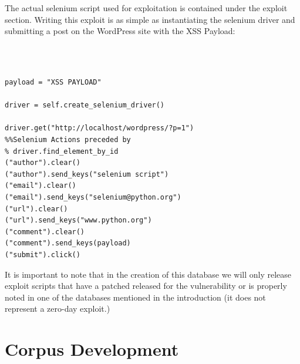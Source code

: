 \documentclass[letterpaper,twocolumn,10pt]{article}
\begin{document}
The actual selenium script used for exploitation is contained under the exploit section.  Writing this exploit is as simple as instantiating the selenium driver and submitting a post on the WordPress site with the XSS Payload: 

{\tt \footnotesize
\begin{verbatim}

payload = "XSS PAYLOAD"

driver = self.create_selenium_driver()

driver.get("http://localhost/wordpress/?p=1")
%%Selenium Actions preceded by
% driver.find_element_by_id
("author").clear()
("author").send_keys("selenium script")
("email").clear()
("email").send_keys("selenium@python.org")
("url").clear()
("url").send_keys("www.python.org")
("comment").clear()
("comment").send_keys(payload)
("submit").click()

\end{verbatim}
}

It is important to note that in the creation of this database we will only release exploit scripts that have a patched released for the vulnerability or is properly noted in one of the databases mentioned in the introduction (it does not represent a zero-day exploit.)



\section{Corpus Development}
\end{document}
